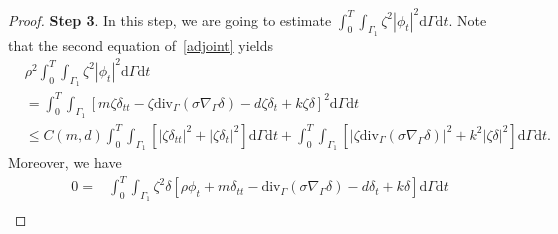 \documentclass[10pt]{elsarticle}
\begin{document}
\begin{proof}
\textbf{Step 3}. In this step, we are going to estimate $\int_{0}^{T}\int_{\Gamma_1}\zeta^2|\phi_t|^2 \mathrm{d}\Gamma \mathrm{d}t$. 
Note that the second equation of~\eqref{adjoint} yields
 \begin{equation}\label{ob11_1}
\begin{split}
&\rho^2\int_{0}^{T}\int_{\Gamma_1}\zeta^2|\phi_t|^2 \mathrm{d}\Gamma \mathrm{d}t \\
&= \int_{0}^{T}\int_{\Gamma_1}\left[m\zeta \delta_{tt} - \zeta\mathrm{div}_{\Gamma}\left(\sigma\nabla_{\Gamma} \delta\right) - d \zeta\delta_t + k\zeta \delta\right]^2\mathrm{d}\Gamma \mathrm{d}t \\
&\leqslant C(m, d)\int_{0}^{T}\int_{\Gamma_1}\left[|\zeta \delta_{tt}|^2 +|\zeta\delta_t|^2 \right]\mathrm{d}\Gamma \mathrm{d}t +\int_{0}^{T}\int_{\Gamma_1}\left[ {|\zeta\mathrm{div}_{\Gamma}\left(\sigma\nabla_{\Gamma} \delta\right)|^2} + {k^2|\zeta \delta|^2} \right]\mathrm{d}\Gamma \mathrm{d}t.
\end{split}
\end{equation}
Moreover, we have
\begin{equation*}
\begin{split}
0= &\int_{0}^{T}\int_{\Gamma_1}\zeta^2\delta\left[\rho\phi_t + m \delta_{tt} - \mathrm{div}_{\Gamma}\left(\sigma\nabla_{\Gamma} \delta\right) - d \delta_t + k \delta\right]\mathrm{d}\Gamma \mathrm{d}t\\

\end{split}
\end{equation*}
\end{proof}
\end{document}
